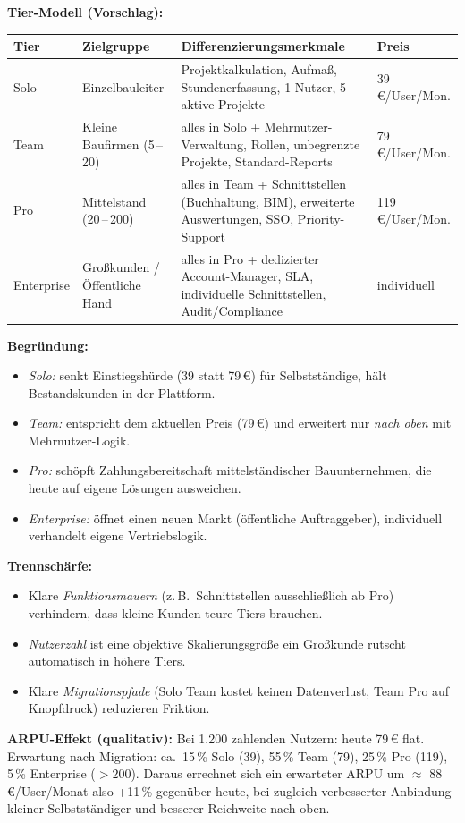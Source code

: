\documentclass[11pt,a4paper,oneside]{article}
\begin{document}
\begin{loesungbox}
\textbf{Tier-Modell (Vorschlag):}

\smallskip
\begin{tabularx}{\linewidth}{@{}lXXl@{}}
\toprule
\textbf{Tier} & \textbf{Zielgruppe} & \textbf{Differenzierungsmerkmale} & \textbf{Preis} \\
\midrule
Solo & Einzelbauleiter & Projektkalkulation, Aufmaß, Stundenerfassung, 1 Nutzer, 5 aktive Projekte & 39\,\euro/User/Mon. \\
\midrule
Team & Kleine Baufirmen (5\,--\,20) & alles in Solo + Mehrnutzer-Verwaltung, Rollen, unbegrenzte Projekte, Standard-Reports & 79\,\euro/User/Mon. \\
\midrule
Pro & Mittelstand (20\,--\,200) & alles in Team + Schnittstellen (Buchhaltung, BIM), erweiterte Auswertungen, SSO, Priority-Support & 119\,\euro/User/Mon. \\
\midrule
Enterprise & Großkunden / Öffentliche Hand & alles in Pro + dedizierter Account-Manager, SLA, individuelle Schnittstellen, Audit/Compliance & individuell \\
\bottomrule
\end{tabularx}

\smallskip
\textbf{Begründung:}
\begin{itemize}
  \item \emph{Solo:} senkt Einstiegshürde (39 statt 79\,\euro) für Selbstständige, hält Bestandskunden in der Plattform.
  \item \emph{Team:} entspricht dem aktuellen Preis (79\,\euro) und erweitert nur \emph{nach oben} mit Mehrnutzer-Logik.
  \item \emph{Pro:} schöpft Zahlungsbereitschaft mittelständischer Bauunternehmen, die heute auf eigene Lösungen ausweichen.
  \item \emph{Enterprise:} öffnet einen neuen Markt (öffentliche Auftraggeber), individuell verhandelt \textendash{} eigene Vertriebslogik.
\end{itemize}

\smallskip
\textbf{Trennschärfe:}
\begin{itemize}
  \item Klare \emph{Funktionsmauern} (z.\,B.\ Schnittstellen ausschließlich ab Pro) verhindern, dass kleine Kunden teure Tiers brauchen.
  \item \emph{Nutzerzahl} ist eine objektive Skalierungsgröße \textendash{} ein Großkunde rutscht automatisch in höhere Tiers.
  \item Klare \emph{Migrationspfade} (Solo \textrightarrow{} Team kostet keinen Datenverlust, Team \textrightarrow{} Pro auf Knopfdruck) reduzieren Friktion.
\end{itemize}

\smallskip
\textbf{ARPU-Effekt (qualitativ):}
Bei 1.200 zahlenden Nutzern: heute 79\,\euro{} flat. Erwartung nach Migration: ca.\ 15\,\% Solo (39), 55\,\% Team (79), 25\,\% Pro (119), 5\,\% Enterprise ($> 200$). Daraus errechnet sich ein erwarteter ARPU um $\approx$ 88\,\euro/User/Monat \textendash{} also +11\,\% gegenüber heute, bei zugleich verbesserter Anbindung kleiner Selbstständiger und besserer Reichweite nach oben.
\end{loesungbox}
\end{document}
